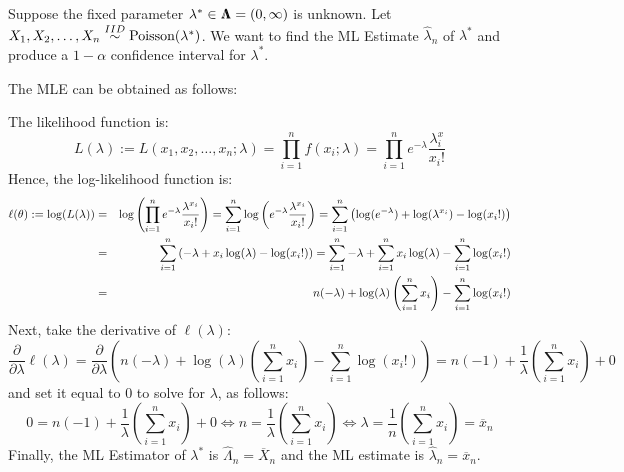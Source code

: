 \begin{example}
Suppose the fixed parameter $\lambda^* \in {\Lambda}\mspace{-11 mu}{\Lambda} = (0,\infty)$ is unknown.  Let $X_1,X_2,\ldots,X_n \overset{IID}{\sim} \mbox{{\rm Poisson}}(\lambda^*)$.  We want to find the ML Estimate $\widehat{\lambda}_n$ of $\lambda^*$ and produce a $1-\alpha$ confidence interval for $\lambda^*$.

The MLE can be obtained as follows:

The likelihood function is:
\[
L(\lambda) := L(x_1,x_2,\ldots,x_n; \lambda) = \prod_{i=1}^n f(x_i;\lambda) = \prod_{i=1}^n e^{-\lambda} \frac{\lambda^x_i}{x_i!}
\]
Hence, the log-likelihood function is:
\begin{eqnarray}
\ell(\theta) := \log(L(\lambda)) 
&=&  \log \left( \prod_{i=1}^n e^{-\lambda} \frac{\lambda^{x_i}}{x_i!} \right) =  \sum_{i=1}^n \log \left(  e^{-\lambda} \frac{\lambda^{x_i}}{x_i!} \right) 
=  \sum_{i=1}^n \left( \log (e^{-\lambda}) + \log( \lambda^{x_i}) - \log({x_i!}) \right)  \notag \\
&=& \sum_{i=1}^n \left({-\lambda} + x_i \log( \lambda) - \log({x_i!}) \right) 
= \sum_{i=1}^n {-\lambda} + \sum_{i=1}^n x_i \log( \lambda) - \sum_{i=1}^n \log({x_i!})  \notag \\
&=& n ( {-\lambda}) + \log( \lambda) \left( \sum_{i=1}^n x_i \right) - \sum_{i=1}^n \log({x_i!})  \notag 
\end{eqnarray}
Next, take the derivative of $\ell(\lambda)$:
\[
\frac{\partial}{\partial \lambda} \ell (\lambda) 
= \frac{\partial}{\partial \lambda} \left(  n ( {-\lambda}) + \log( \lambda) \left( \sum_{i=1}^n x_i \right) - \sum_{i=1}^n \log({x_i!})  \right)
= n(-1) + \frac{1}{\lambda} \left( \sum_{i=1}^n x_i \right) + 0
\]
and set it equal to $0$ to solve for $\lambda$, as follows:
\[
0 = n(-1) + \frac{1}{\lambda} \left( \sum_{i=1}^n x_i \right) + 0 \iff n = \frac{1}{\lambda} \left( \sum_{i=1}^n x_i \right) \iff \lambda =  \frac{1}{n} \left( \sum_{i=1}^n x_i \right) = \overline{x}_n
\]
Finally, the ML Estimator of $\lambda^*$ is $\widehat{\Lambda}_n = \overline{X}_n$ and the ML estimate is $\widehat{\lambda}_n = \overline{x}_n$.


\end{example}
